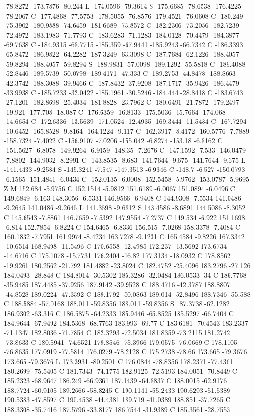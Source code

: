 {{{-78.8272 -173.7876 -80.244 L -174.0596 -79.3614 S -175.6685 -78.6538 -176.4225 -78.2067 C -177.4868 -77.5753 -178.5055 -76.8576 -179.4521 -76.0608 C -180.249 -75.3902 -180.9888 -74.6459 -181.6689 -73.8572 C -182.2306 -73.2056 -182.7239 -72.4972 -183.1983 -71.7793 C -183.6283 -71.1283 -184.0128 -70.4479 -184.3877 -69.7638 C -184.9315 -68.7715 -185.359 -67.9441 -185.9243 -66.7342 C -186.3393 -65.8472 -186.9822 -64.2282 -187.3249 -63.3098 C -187.7684 -62.1226 -188.4057 -59.8294 -188.4057 -59.8294 S -188.9831 -57.0098 -189.1292 -55.5818 C -189.4088 -52.8446 -189.5739 -50.0798 -189.4171 -47.333 C -189.2753 -44.8478 -188.8663 -42.3742 -188.3088 -39.9466 C -187.8432 -37.9208 -187.1717 -35.9426 -186.4479 -33.9938 C -185.7233 -32.0422 -185.1961 -30.5246 -184.444 -28.8418 C -183.6743 -27.1201 -182.8698 -25.4034 -181.8828 -23.7962 C -180.6491 -21.7872 -179.2497 -19.921 -177.708 -18.087 C -176.6359 -16.8133 -175.5036 -15.7664 -174.068 -14.6654 C -172.6336 -13.5639 -171.0524 -12.4935 -169.3444 -11.5434 C -167.7294 -10.6452 -165.8528 -9.8164 -164.1224 -9.117 C -162.3917 -8.4172 -160.5776 -7.7889 -158.7324 -7.4022 C -156.9107 -7.0206 -155.042 -6.8274 -153.18 -6.8162 C -151.5627 -6.8078 -149.9264 -6.9159 -148.35 -7.2676 C -147.1592 -7.533 -146.0479 -7.8802 -144.9032 -8.2991 C -143.8535 -8.683 -141.7644 -9.675 -141.7644 -9.675 L -141.4433 -9.2584 S -145.3241 -7.547 -147.3513 -6.9346 C -148.7 -6.527 -150.0793 -6.1565 -151.4841 -6.0434 C -152.0135 -6.0008 -152.5458 -5.9762 -153.0787 -5.9695 Z M 152.684 -5.9756 C 152.1514 -5.9812 151.6189 -6.0067 151.0894 -6.0496 C 149.6849 -6.163 148.3056 -6.5331 146.9566 -6.9408 C 144.9308 -7.5534 141.0486 -9.2645 141.0486 -9.2645 L 141.3698 -9.6812 S 143.4586 -8.6891 144.5086 -8.3052 C 145.6543 -7.8861 146.7659 -7.5392 147.9554 -7.2737 C 149.534 -6.922 151.1698 -6.814 152.7854 -6.8224 C 154.6465 -6.8336 156.515 -7.0268 158.3378 -7.4084 C 160.1832 -7.7951 161.9974 -8.4234 163.7278 -9.1231 C 165.4584 -9.8226 167.3342 -10.6514 168.9498 -11.5496 C 170.6558 -12.4985 172.237 -13.5692 173.6734 -14.6716 C 175.1078 -15.7731 176.2404 -16.82 177.3134 -18.0932 C 178.8562 -19.9261 180.2562 -21.792 181.4882 -23.8024 C 182.4752 -25.4096 183.2796 -27.126 184.0493 -28.848 C 184.8014 -30.5302 185.3286 -32.0484 186.0533 -34 C 186.7768 -35.9485 187.4485 -37.9256 187.9142 -39.9528 C 188.4716 -42.3787 188.8807 -44.8528 189.0224 -47.3392 C 189.1792 -50.0863 189.014 -52.8496 188.7346 -55.588 C 188.5884 -57.0168 188.011 -59.8356 188.011 -59.8356 S 187.3738 -62.1282 186.9302 -63.316 C 186.5875 -64.2333 185.9446 -65.8525 185.5297 -66.7404 C 184.9644 -67.9492 184.5368 -68.7763 183.993 -69.77 C 183.6181 -70.4543 183.2337 -71.1347 182.8036 -71.7854 C 182.3293 -72.5034 181.8359 -73.2115 181.2742 -73.8633 C 180.5941 -74.6521 179.8546 -75.3966 179.0575 -76.0669 C 178.1105 -76.8635 177.0919 -77.5814 176.0279 -78.2128 C 175.2738 -78.66 173.665 -79.3676 173.665 -79.3676 L 173.3931 -80.2501 C 176.0844 -78.8356 178.2371 -77.4361 180.2699 -75.5405 C 181.7343 -74.1775 182.9125 -72.5193 184.0051 -70.8449 C 185.2323 -68.9647 186.249 -66.9361 187.1439 -64.8837 C 188.0015 -62.9176 188.7724 -60.9105 189.2666 -58.8245 C 190.1141 -55.2433 190.6293 -51.5389 190.5383 -47.8597 C 190.4538 -44.4381 189.719 -41.0389 188.851 -37.7265 C 188.3308 -35.7416 187.5796 -33.8177 186.7544 -31.9389 C 185.3561 -28.7553 }}}
